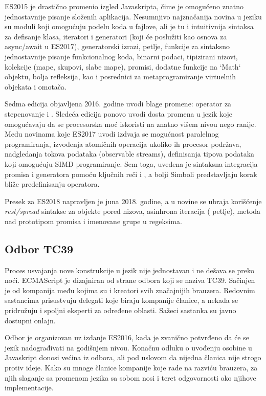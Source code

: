 ES2015 je drastično promenio izgled Javaskripta, čime je omogućeno znatno jednostavnije pisanje složenih aplikacija.
Nesumnjivo najznačanija novina u jeziku su moduli koji omogućuju podelu koda u fajlove, ali je tu i intuitivnija sintaksa za defisanje klasa, iteratori i generatori (koji će poslužiti kao osnova za async/await u ES2017), generatorski izrazi,  petlje,  funkcije za sintaksno jednostavnije pisanje funkcionalnog koda, binarni podaci, tipizirani nizovi, kolekcije (mape, skupovi, slabe mape), promisi, dodatne funkcije na `Math` objektu, bolja refleksija, kao i posrednici za metaprogramiranje virtuelnih objekata i omotača.

Sedma edicija objavljena 2016. godine uvodi blage promene: operator za stepenovanje \code{**} i . Sledeća edicija ponovo uvodi dosta promena u jezik koje omogućavaju da se procesorska moć iskoristi na znatno višem nivou nego ranije. Medu novinama koje ES2017 uvodi izdvaja se mogućnost paralelnog programiranja, izvodenja atomičnih operacija ukoliko ih procesor podržava, nadgledanja tokova podataka (observable streams), definisanja tipova podataka koji omogućuju SIMD programiranje. Sem toga, uvedena je sintaksna integracija promisa i generatora pomoću ključnih reči  i , a bolji Simboli predstavljaju korak bliže predefinisanju operatora.

Presek za ES2018 napravljen je juna 2018. godine, a u novine se ubraja korišćenje \textsl{rest/spread} sintakse za objekte pored nizova, asinhrona iteracija ( petlje), metoda  nad prototipom promisa i imenovane grupe u regeksima.

\subsection{Odbor TC39}

Proces usvajanja nove konstrukcije u jezik nije jednostavan i ne dešava se preko noći.
ECMAScript je dizajniran od strane odbora koji se naziva TC39.
Sačinjen je od kompanija među kojima su i kreatori svih značajnijih brauzera.
Redovnim sastancima prisustvuju delegati koje biraju kompanije članice, a nekada se pridružuju i spoljni eksperti za određene oblasti.
Sažeci sastanka su javno dostupni onlajn.

Odbor je organizovan uz izdanje ES2016, kada je zvanično potvrđeno da će se jezik nadograđivati na godišnjem nivou.
Konačnu odluku o uvođenju osobine u Javaskript donosi većina iz odbora, ali pod uslovom da nijedna članica nije strogo protiv ideje.
Kako su mnoge članice kompanije koje rade na razviću brauzera, za njih slaganje sa promenom jezika sa sobom nosi i teret odgovornosti oko njihove implementacije.

